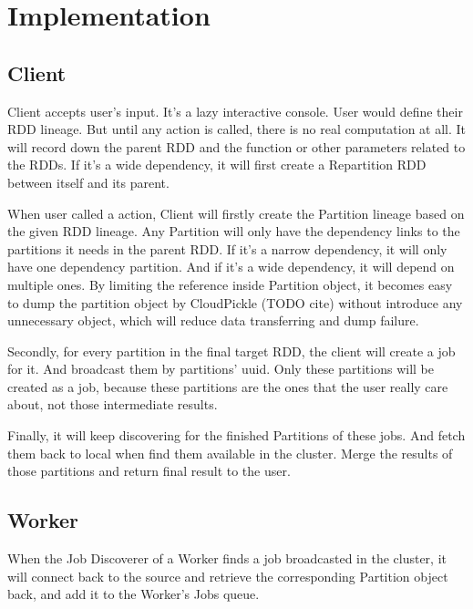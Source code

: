 

\section{Implementation} %
\label{sec:implementation}

\subsection{Client} %
\label{sub:client}
Client accepts user's input. It's a lazy interactive console.
User would define their RDD lineage. But until any action is called, there is no real computation at all.
It will record down the parent RDD and the function or other parameters related to the RDDs\@.
If it's a wide dependency, it will first create a Repartition RDD between itself and its parent.

When user called a action, Client will firstly create the Partition lineage based on the given RDD lineage.
Any Partition will only have the dependency links to the partitions it needs in the parent RDD\@.
If it's a narrow dependency, it will only have one dependency partition.
And if it's a wide dependency, it will depend on multiple ones.
By limiting the reference inside Partition object,
it becomes easy to dump the partition object by CloudPickle (TODO cite) without introduce any unnecessary object,
which will reduce data transferring and dump failure.

Secondly, for every partition in the final target RDD, the client will create a job for it.
And broadcast them by partitions' uuid.
Only these partitions will be created as a job,
because these partitions are the ones that the user really care about, not those intermediate results.

Finally, it will keep discovering for the finished Partitions of these jobs.
And fetch them back to local when find them available in the cluster.
Merge the results of those partitions and return final result to the user.

\subsection{Worker} %
\label{sub:worker}
When the Job Discoverer of a Worker finds a job broadcasted in the cluster,
it will connect back to the source and retrieve the corresponding Partition object back,
and add it to the Worker's Jobs queue.

